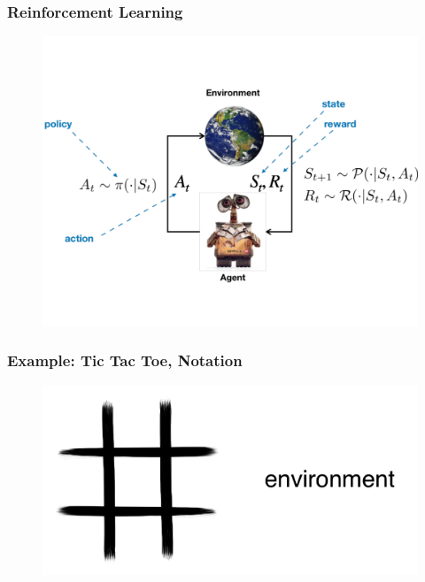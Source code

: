 \documentclass{beamer}
\begin{document}
\begin{frame}\frametitle{Reinforcement Learning}\small

\begin{figure}
\includegraphics[width=0.85\linewidth]{Figures/RL_agent}
\end{figure}

%
\end{frame}

\begin{frame}\frametitle{Example: Tic Tac Toe, Notation}\small
\vspace{4mm}
\begin{figure}
\includegraphics[width=0.75\linewidth]{Figures/tic1d}
\end{figure}
\vspace{5mm}
\end{frame}
\end{document}
